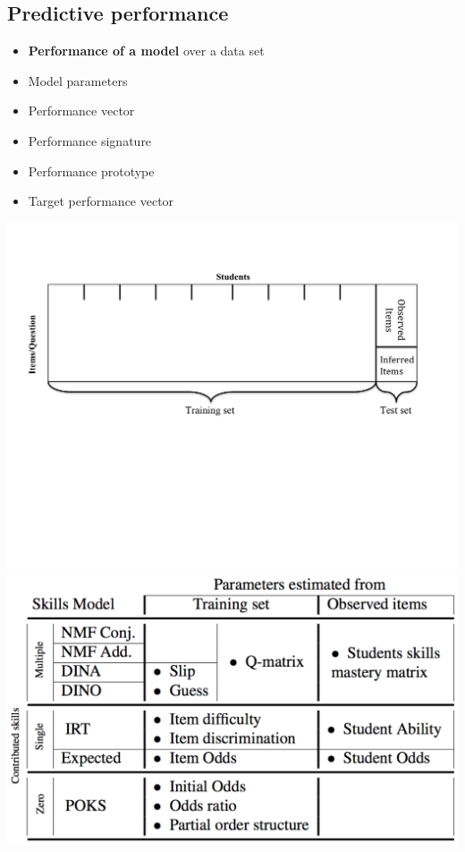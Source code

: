 \documentclass{beamer}
\begin{document}
\subsection{Predictive performance}
\begin{frame}
\begin{itemize}
\item<1-> \textbf{Performance of a model} over a data set
\item<2-> Model parameters
\item<3-> Performance vector
\item<3-> Performance signature
\item<4-> Performance prototype
\item<5-> Target performance vector
\end{itemize}
\begin{overprint}
\vspace{-2cm}
 \centering \includegraphics[trim=0cm 8.5cm 2.4cm 2.4cm,clip=true,width=\textwidth]{images/Methodology.pdf}
 \vspace{1cm} \centering \includegraphics[width=.7\textwidth]{images/Parameters-Model}

\end{overprint}
\end{frame}
\end{document}
